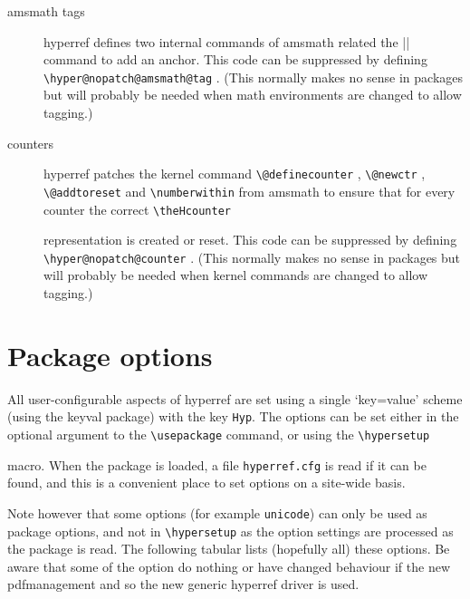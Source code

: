 \documentclass{article}
\newcommand*{\cs}[1]{%
  \texttt{\textbackslash #1}%
}
\newcommand*{\xpackage}[1]{\textsf{#1}}
\begin{document}
\begin{description}
\item[amsmath tags] hyperref defines two internal commands of amsmath 
    related the |\tag| command to add an anchor. This code can be 
    suppressed by defining \cs{hyper@nopatch@amsmath@tag}. (This normally 
    makes no sense in packages but will probably be needed when math 
    environments are changed to allow tagging.) 
   
\item[counters] hyperref patches the kernel command \cs{@definecounter}, 
    \cs{@newctr}, \cs{@addtoreset} and \cs{numberwithin} from amsmath to 
    ensure that for every counter the correct \cs{theHcounter} 
    representation is created or reset. This code can be suppressed by 
    defining \cs{hyper@nopatch@counter}. (This normally makes no sense in 
    packages but will probably be needed when kernel commands are changed 
    to allow tagging.)  
\end{description}

\section{Package options}

All user-configurable aspects of \xpackage{hyperref} are set using a
single `key=value' scheme (using the \xpackage{keyval} package) with the
key \texttt{Hyp}. The options can be set either in the optional argument
to the \cs{usepackage} command, or using the \cs{hypersetup}
macro. When the package is loaded, a file \texttt{hyperref.cfg} is read
if it can be found, and this is a convenient place to set options on a
site-wide basis.

Note however that some options (for example \texttt{unicode}) can only be used as
package options, and not in \verb|\hypersetup| as the option settings are processed
as the package is read. The following tabular lists (hopefully all) these options.
Be aware that some of the option do nothing or have
changed behaviour if the new pdfmanagement and so the new generic hyperref driver is used.
\end{document}
